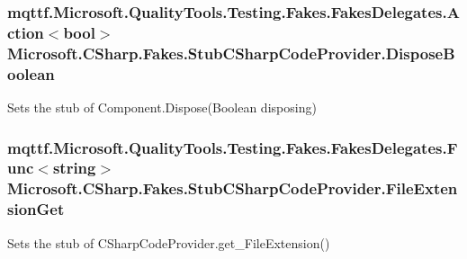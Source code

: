 \hypertarget{class_microsoft_1_1_c_sharp_1_1_fakes_1_1_stub_c_sharp_code_provider_a83dafacd3e80b9584e294dcb93acac7a}{
\subsubsection[{Dispose\-Boolean}]{\setlength{\rightskip}{0pt plus 5cm}mqttf.\-Microsoft.\-Quality\-Tools.\-Testing.\-Fakes.\-Fakes\-Delegates.\-Action$<$bool$>$ Microsoft.\-C\-Sharp.\-Fakes.\-Stub\-C\-Sharp\-Code\-Provider.\-Dispose\-Boolean}}\label{class_microsoft_1_1_c_sharp_1_1_fakes_1_1_stub_c_sharp_code_provider_a83dafacd3e80b9584e294dcb93acac7a}


Sets the stub of Component.\-Dispose(\-Boolean disposing)

\hypertarget{class_microsoft_1_1_c_sharp_1_1_fakes_1_1_stub_c_sharp_code_provider_a4e4f3d83ddcbf64a32eac74f476e1b33}{
\subsubsection[{File\-Extension\-Get}]{\setlength{\rightskip}{0pt plus 5cm}mqttf.\-Microsoft.\-Quality\-Tools.\-Testing.\-Fakes.\-Fakes\-Delegates.\-Func$<$string$>$ Microsoft.\-C\-Sharp.\-Fakes.\-Stub\-C\-Sharp\-Code\-Provider.\-File\-Extension\-Get}}\label{class_microsoft_1_1_c_sharp_1_1_fakes_1_1_stub_c_sharp_code_provider_a4e4f3d83ddcbf64a32eac74f476e1b33}


Sets the stub of C\-Sharp\-Code\-Provider.\-get\-\_\-\-File\-Extension()

